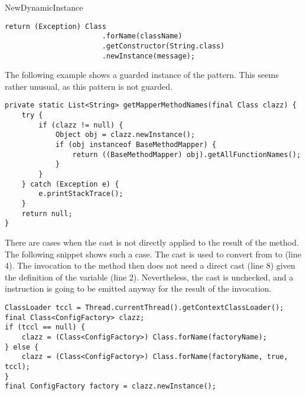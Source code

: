 \begin{pattern}{NewDynamicInstance}
\begin{verbatim}
return (Exception) Class
                       .forName(className)
                       .getConstructor(String.class)
                       .newInstance(message);
\end{verbatim}

The following example%
\def\urlvar{http://bit.ly/alibaba_LuaViewSDK_2HC33xg}
shows a guarded instance of the \thisp{} pattern.
This seems rather unusual, as this pattern is not guarded.

\begin{verbatim}
private static List<String> getMapperMethodNames(final Class clazz) {
    try {
        if (clazz != null) {
            Object obj = clazz.newInstance();
            if (obj instanceof BaseMethodMapper) {
                return ((BaseMethodMapper) obj).getAllFunctionNames();
            }
        }
    } catch (Exception e) {
        e.printStackTrace();
    }
    return null;
}
\end{verbatim}

There are cases when the cast is not directly applied to the result of the  method.
The following snippet shows such a case.%
\def\urlvar{http://bit.ly/pac4j_pac4j_2HJtXUn}
The cast is used to convert from  to  (line 4).
The invocation to the  method then does not need a direct cast (line 8) given the definition of the  variable (line 2).
Nevertheless, the cast is unchecked, and a  instruction is going to be emitted anyway for the result of the  invocation.

\begin{verbatim}
ClassLoader tccl = Thread.currentThread().getContextClassLoader();
final Class<ConfigFactory> clazz;
if (tccl == null) {
    clazz = (Class<ConfigFactory>) Class.forName(factoryName);
} else {
    clazz = (Class<ConfigFactory>) Class.forName(factoryName, true, tccl);
}
final ConfigFactory factory = clazz.newInstance();
\end{verbatim}




\end{pattern}
